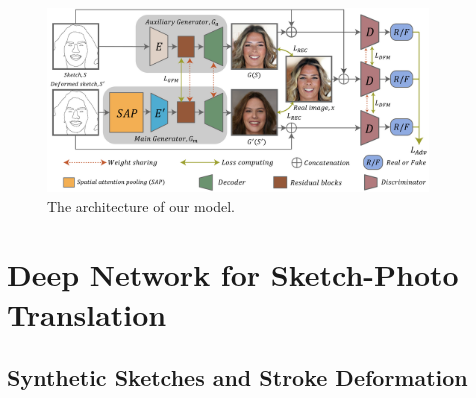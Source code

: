 


\begin{figure}[tb]
	\includegraphics[width=0.9\textwidth]{figs/architecture}
	\caption{The architecture of our model.}
	\label{fig:architecture}
\end{figure}
%

\section{Deep Network for Sketch-Photo Translation}
\label{sec:network}

%



\subsection{Synthetic Sketches and Stroke Deformation}
\label{subsec:algorithm_data}



